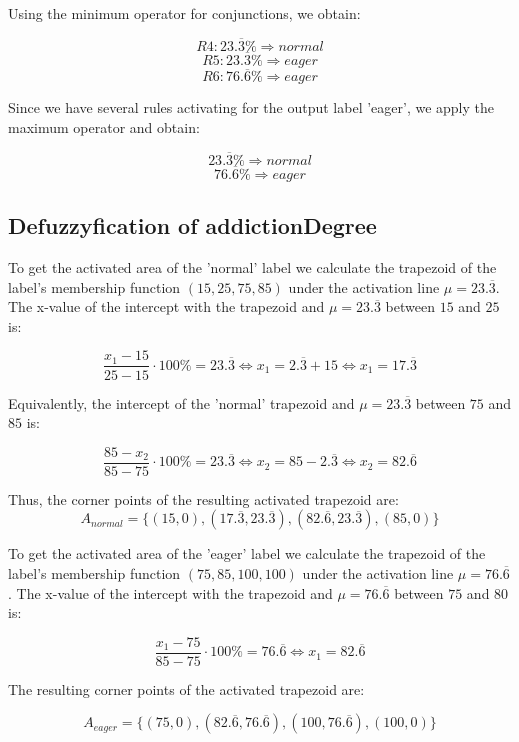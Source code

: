 Using the minimum operator for conjunctions, we obtain:

\[ R4: 23.\overline{3}\% \Rightarrow normal \]
\[ R5: 23.\overline{3}\% \Rightarrow eager \]
\[ R6: 76.\overline{6}\% \Rightarrow eager \]

Since we have several rules activating for the output label 'eager', we apply the maximum operator and obtain:

\[ 23.\overline{3}\% \Rightarrow normal \]
\[ 76.\overline{6}\% \Rightarrow eager \]

\subsection{Defuzzyfication of addictionDegree}


To get the activated area of the 'normal' label we calculate the trapezoid of the label's membership function $(15,25,75,85)$ under the activation line $\mu = 23.\overline{3}$. The x-value of the intercept with the trapezoid and $\mu = 23.\overline{3}$ between $15$ and $25$ is:

\[ \frac{x_1-15}{25-15} \cdot 100\% = 23.\overline{3} \Leftrightarrow x_1 = 2.\overline{3} + 15 \Leftrightarrow x_1 = 17.\overline{3} \]

Equivalently, the intercept of the 'normal' trapezoid and $\mu = 23.\overline{3}$ between $75$ and $85$ is:

\[ \frac{85-x_2}{85-75} \cdot 100\% = 23.\overline{3} \Leftrightarrow x_2 = 85 - 2.\overline{3} \Leftrightarrow x_2 = 82.\overline{6} \]

Thus, the corner points of the resulting activated trapezoid are: 
\[A_{normal} = \{(15,0),(17.\overline{3},23.\overline{3}),(82.\overline{6},23.\overline{3}),(85,0) \}\]



To get the activated area of the 'eager' label we calculate the trapezoid of the label's membership function $(75,85,100,100)$ under the activation line $\mu = 76.\overline{6}$. The x-value of the intercept with the trapezoid and $\mu = 76.\overline{6}$ between $75$ and $80$ is:

\[ \frac{x_1-75}{85-75} \cdot 100\% = 76.\overline{6} \Leftrightarrow x_1 =  82.\overline{6} \]

The resulting corner points of the activated trapezoid are:

\[A_{eager} = \{(75,0), (82.\overline{6},76.\overline{6}), (100,76.\overline{6}), (100,0) \}\]

